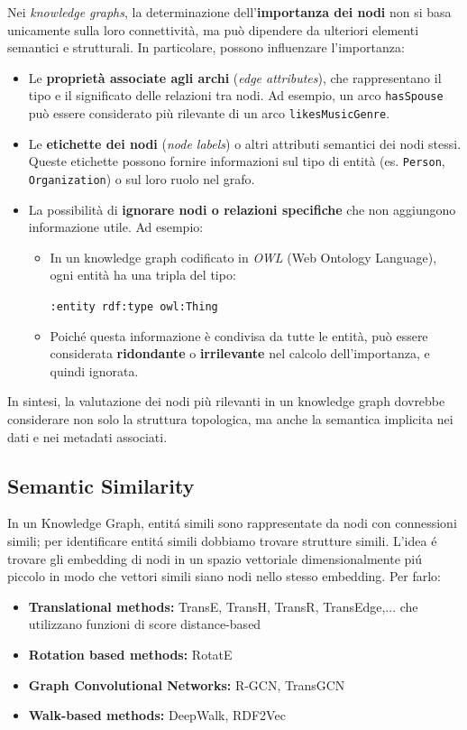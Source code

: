 Nei \textit{knowledge graphs}, la determinazione dell'\textbf{importanza dei nodi} non si basa unicamente sulla loro connettività, ma può dipendere da ulteriori elementi semantici e strutturali. In particolare, possono influenzare l'importanza:

\begin{itemize}
  \item Le \textbf{proprietà associate agli archi} (\textit{edge attributes}), che rappresentano il tipo e il significato delle relazioni tra nodi. Ad esempio, un arco \texttt{hasSpouse} può essere considerato più rilevante di un arco \texttt{likesMusicGenre}.
  
  \item Le \textbf{etichette dei nodi} (\textit{node labels}) o altri attributi semantici dei nodi stessi. Queste etichette possono fornire informazioni sul tipo di entità (es. \texttt{Person}, \texttt{Organization}) o sul loro ruolo nel grafo.

  \item La possibilità di \textbf{ignorare nodi o relazioni specifiche} che non aggiungono informazione utile. Ad esempio:
  \begin{itemize}
    \item In un knowledge graph codificato in \textit{OWL} (Web Ontology Language), ogni entità ha una tripla del tipo:
    \begin{center}
      \texttt{:entity rdf:type owl:Thing}
    \end{center}
    \item Poiché questa informazione è condivisa da tutte le entità, può essere considerata \textbf{ridondante} o \textbf{irrilevante} nel calcolo dell'importanza, e quindi ignorata.
  \end{itemize}
\end{itemize}

In sintesi, la valutazione dei nodi più rilevanti in un knowledge graph dovrebbe considerare non solo la struttura topologica, ma anche la semantica implicita nei dati e nei metadati associati.

\subsection{Semantic Similarity}
In un Knowledge Graph, entitá simili sono rappresentate da nodi con connessioni simili; per identificare entitá simili dobbiamo trovare strutture simili. L'idea é trovare gli embedding di nodi in un spazio vettoriale dimensionalmente piú piccolo in modo che vettori simili siano nodi nello stesso embedding. Per farlo:
\begin{itemize}
    \item \textbf{Translational methods:} TransE, TransH, TransR, TransEdge,... che utilizzano funzioni di score distance-based
    \item \textbf{Rotation based methods:} RotatE
    \item \textbf{Graph Convolutional Networks:} R-GCN, TransGCN
    \item \textbf{Walk-based methods:} DeepWalk, RDF2Vec
\end{itemize}

